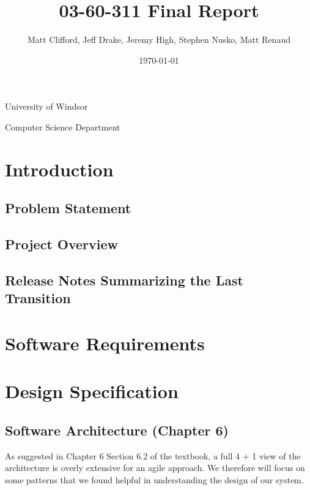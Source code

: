 \documentclass[11pt]{article}
\title{03-60-311 Final Report}
\author{Matt Clifford, Jeff Drake, Jeremy High, Stephen Nusko, Matt Renaud}
\date{\today}
\begin{document}
\maketitle

\vspace{1.5in}

\begin{center}
  University of Windsor

  Computer Science Department
\end{center}

\newpage
\setcounter{tocdepth}{3}
\tableofcontents
\vspace*{1cm}

\section{Introduction}
\label{sec-introduction}

\subsection{Problem Statement}
\label{sec-prodlem-statement}

\subsection{Project Overview}
\label{sec-project-overview}

\subsection{Release Notes Summarizing the Last Transition}
\label{sec-release-notes}

\section{Software Requirements}
\label{sec-software-reqs}

\section{Design Specification}
\label{sec-design-specs}

\subsection{Software Architecture (Chapter 6)}
\label{sec-software-architecture}

	As suggested in Chapter 6 Section 6.2 of the textbook, a full 4 + 1 view of the architecture is overly extensive for an agile approach.
	We therefore will focus on some patterns that we found helpful in understanding the design of our system.
\end{document}
